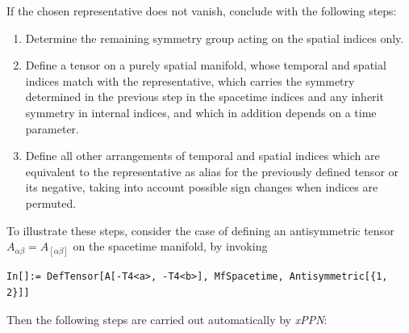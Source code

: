 \documentclass[notitlepage,a4paper,aps,prd,onecolumn,superscriptaddress,nofootinbib,groupedaddress,longbibliography]{revtex4-1}
\newcommand{\xPPN}{\emph{xPPN}}
\begin{document}
\begin{enumerate}
\begin{enumerate}
If the chosen representative does not vanish, conclude with the following steps:
\begin{enumerate}
\item
Determine the remaining symmetry group acting on the spatial indices only.
\item
Define a tensor on a purely spatial manifold, whose temporal and spatial indices match with the representative, which carries the symmetry determined in the previous step in the spacetime indices and any inherit symmetry in internal indices, and which in addition depends on a time parameter.
\item
Define all other arrangements of temporal and spatial indices which are equivalent to the representative as alias for the previously defined tensor or its negative, taking into account possible sign changes when indices are permuted.
\end{enumerate}
\end{enumerate}
\end{enumerate}
To illustrate these steps, consider the case of defining an antisymmetric tensor \(A_{\alpha\beta} = A_{[\alpha\beta]}\) on the spacetime manifold, by invoking
\begin{lstlisting}
In[]:= DefTensor[A[-T4<a>, -T4<b>], MfSpacetime, Antisymmetric[{1, 2}]]
\end{lstlisting}
Then the following steps are carried out automatically by \xPPN:
\end{document}
